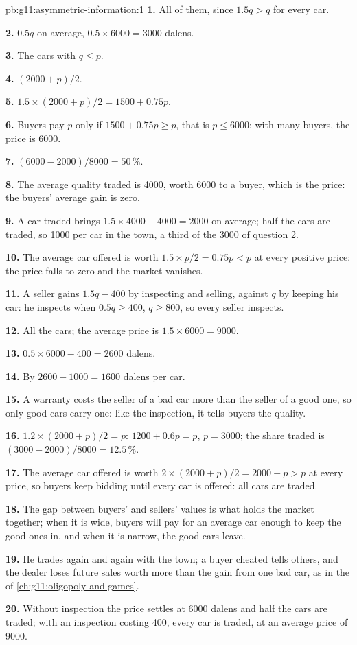 \begin{solution}{pb:g11:asymmetric-information:1}
\textbf{1.} All of them, since $1.5q > q$ for every car.

\textbf{2.} $0.5q$ on average, $0.5 \times 6000 = 3000$ dalens.

\textbf{3.} The cars with $q \le p$.

\textbf{4.} $(2000 + p)/2$.

\textbf{5.} $1.5 \times (2000 + p)/2 = 1500 + 0.75p$.

\textbf{6.} Buyers pay $p$ only if $1500 + 0.75p \ge p$, that is $p \le 6000$; with many buyers, the price is 6000.

\textbf{7.} $(6000 - 2000)/8000 = 50\,\%$.

\textbf{8.} The average quality traded is 4000, worth 6000 to a buyer, which is the price: the buyers' average gain is zero.

\textbf{9.} A car traded brings $1.5 \times 4000 - 4000 = 2000$ on average; half the cars are traded, so 1000 per car in the town, a third of the 3000 of question 2.

\textbf{10.} The average car offered is worth $1.5 \times p/2 = 0.75p < p$ at every positive price: the price falls to zero and the market vanishes.

\textbf{11.} A seller gains $1.5q - 400$ by inspecting and selling, against $q$ by keeping his car: he inspects when $0.5q \ge 400$, $q \ge 800$, so every seller inspects.

\textbf{12.} All the cars; the average price is $1.5 \times 6000 = 9000$.

\textbf{13.} $0.5 \times 6000 - 400 = 2600$ dalens.

\textbf{14.} By $2600 - 1000 = 1600$ dalens per car.

\textbf{15.} A warranty costs the seller of a bad car more than the seller of a good one, so only good cars carry one: like the inspection, it tells buyers the quality.

\textbf{16.} $1.2 \times (2000 + p)/2 = p$: $1200 + 0.6p = p$, $p = 3000$; the share traded is $(3000 - 2000)/8000 = 12.5\,\%$.

\textbf{17.} The average car offered is worth $2 \times (2000 + p)/2 = 2000 + p > p$ at every price, so buyers keep bidding until every car is offered: all cars are traded.

\textbf{18.} The gap between buyers' and sellers' values is what holds the market together; when it is wide, buyers will pay for an average car enough to keep the good
ones in, and when it is narrow, the good cars leave.

\textbf{19.} He trades again and again with the town; a buyer cheated tells others, and the dealer loses future sales worth more than the gain from one bad car, as in
the  of \cref{ch:g11:oligopoly-and-games}.

\textbf{20.} Without inspection the price settles at 6000 dalens and half the cars are traded; with an inspection costing 400, every car is traded, at an average price of 9000.
\end{solution}
